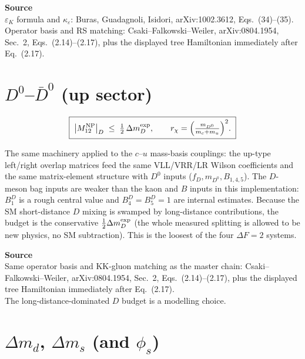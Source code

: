 \documentclass[11pt]{article}
\newcommand{\Mtwelve}{M_{12}}
\newcommand{\eps}{\varepsilon}
\newcommand{\epsK}{\varepsilon_K}
\newenvironment{srcbox}{\begin{srcboxframe}\small\raggedright\sloppy}{\end{srcboxframe}}
\begin{document}
\begin{srcbox}
\textbf{Source}\\[2pt]
$\epsK$ formula and $\kappa_\eps$: Buras, Guadagnoli,
Isidori, arXiv:1002.3612, Eqs.~(34)--(35).\\[2pt]
Operator basis and RS matching:
Csaki--Falkowski--Weiler, arXiv:0804.1954, Sec.~2, Eqs.~(2.14)--(2.17), plus
the displayed tree Hamiltonian immediately after Eq.~(2.17).
\end{srcbox}

\bigskip
\section*{$D^0$--$\bar D^0$ (up sector)}

\begin{equation}
\boxed{\;
\big|\Mtwelve^{\rm NP}\big|_{D}\;\le\;\tfrac12\,\Delta m_D^{\rm exp},
\qquad
r_\chi=\Big(\tfrac{m_{D^0}}{m_c+m_u}\Big)^2.
\;}
\end{equation}

\noindent The same machinery applied to the $c$--$u$ mass-basis couplings: the
up-type left/right overlap matrices feed the same VLL/VRR/LR Wilson coefficients
and the same matrix-element structure with $D^0$ inputs ($f_D,m_{D^0},B_{1,4,5}$).
The $D$-meson bag inputs are weaker than the kaon and $B$ inputs in this
implementation: $B_1^D$ is a rough central value and $B_4^D=B_5^D=1$ are
internal estimates.
Because the SM short-distance $D$ mixing is swamped by long-distance
contributions, the budget is the conservative $\tfrac12\Delta m_D^{\rm exp}$ (the
whole measured splitting is allowed to be new physics, no SM subtraction). This is
the loosest of the four $\Delta F=2$ systems.

\begin{srcbox}
\textbf{Source}\\[2pt]
Same operator basis and KK-gluon matching as the master chain:
Csaki--Falkowski--Weiler, arXiv:0804.1954, Sec.~2, Eqs.~(2.14)--(2.17), plus
the displayed tree Hamiltonian immediately after Eq.~(2.17).\\[2pt]
The long-distance-dominated $D$
budget is a modelling choice.
\end{srcbox}

\bigskip
\section*{$\Delta m_d$, $\Delta m_s$ (and $\phi_s$)}
\end{document}
